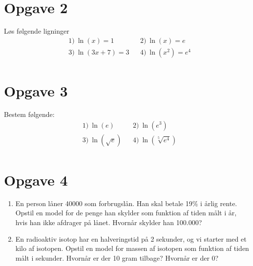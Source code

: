 \section*{Opgave 2}
Løs følgende ligninger
\begin{align*}
&1) \ \ln(x)=1   &&2) \ \ln(x)=e    \\
&3) \ \ln(3x+7) = 3   &&4) \  \ln(x^2) = e^4   \\
\end{align*}
\section*{Opgave 3}
Bestem følgende:
\begin{align*}
&1) \  \ln(e)  &&2) \  \ln(e^3)    \\
&3) \  \ln(\sqrt{e})  &&4) \ \ln(\sqrt[5]{e^4})      \\
\end{align*}

\section*{Opgave 4}
\begin{enumerate}[label=\roman*)]
\item En person låner 40000 som forbrugslån. Han skal betale 19$\%$ i årlig rente. Opstil en model for de penge han skylder som funktion af tiden målt i år, hvis han ikke afdrager på lånet. Hvornår skylder han 100.000?
\item En radioaktiv isotop har en halveringstid på 2 sekunder, og vi starter med et kilo af isotopen. Opstil en model for massen af isotopen som funktion af tiden målt i sekunder. Hvornår er der 10 gram tilbage? Hvornår er der 0?
\end{enumerate}

